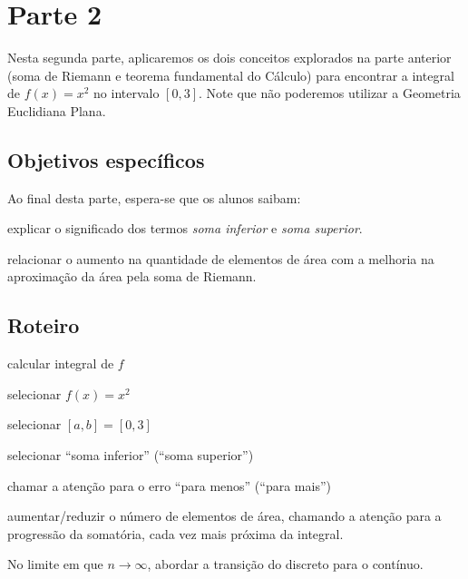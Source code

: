 \documentclass[a4paper,12pt]{scrartcl}
\begin{document}
    \section*{Parte 2}
    
      Nesta segunda parte, aplicaremos os dois conceitos explorados na parte anterior (soma de Riemann e teorema fundamental do Cálculo)
      para encontrar a integral de $f(x) = x^2$ no intervalo $[0,3]$. Note que não poderemos utilizar a Geometria Euclidiana Plana.
    
      \subsection*{Objetivos específicos}
  
      Ao final desta parte, espera-se que os alunos saibam:
      \begin{compactitem}
	\item explicar o significado dos termos \emph{soma inferior} e \emph{soma superior}.
	\item relacionar o aumento na quantidade de elementos de área com a melhoria na aproximação da área pela soma de Riemann.
      \end{compactitem}
      
      \subsection*{Roteiro}
           
      \begin{list}{.}{
	\setlength\leftmargin{0cm}%
	\setlength\itemindent\parindent%
	\setlength\listparindent{\parindent}%
        \setlength{}%
        \setlength{}%
      }
    
	\item calcular integral de $f$
	\item selecionar $f(x) = x^2$
	\item selecionar $[a,b] = [0,3]$
	\item selecionar ``soma inferior'' (``soma superior'')
	\item chamar a atenção para o erro ``para menos'' (``para mais'')
	\item aumentar/reduzir o número de elementos de área, chamando a atenção para a progressão da somatória, cada vez mais próxima da integral.
	\item No limite em que $n \to \infty$, abordar a transição do discreto para o contínuo.
    
      \end{list}
      
\end{document}
